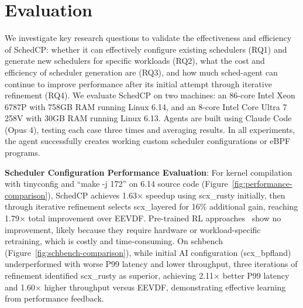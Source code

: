 \documentclass[preprint]{article}
\newcommand{\sys}{SchedCP\xspace}
\newcommand{\agent}{sched-agent\xspace}
\begin{document}
\section{Evaluation}
\label{sec:evaluation}


We investigate key research questions to validate the effectiveness and efficiency of \sys: whether it can effectively configure existing schedulers (RQ1) and generate new schedulers for specific workloads (RQ2), what the cost and efficiency of scheduler generation are (RQ3), and how much \agent can continue to improve performance after its initial attempt through iterative refinement (RQ4). We evaluate \sys on two machines: an 86-core Intel Xeon 6787P with 758GB RAM running Linux 6.14, and an 8-core Intel Core Ultra 7 258V with 30GB RAM running Linux 6.13. Agents are built using Claude Code (Opus 4), testing each case three times and averaging results. In all experiments, the agent successfully creates working custom scheduler configurations or eBPF programs.

\textbf{Scheduler Configuration Performance Evaluation}: For kernel compilation with tinyconfig and ``make -j 172'' on 6.14 source code (Figure~\ref{fig:performance-comparison}), \sys achieves 1.63× speedup using scx\_rusty initially, then through iterative refinement selects scx\_layered for 16\% additional gain, reaching 1.79× total improvement over EEVDF. Pre-trained RL approaches~\cite{corbet2025ml} show no improvement, likely because they require hardware or workload-specific retraining, which is costly and time-consuming. On schbench~\cite{schbench2016} (Figure~\ref{fig:schbench-comparison}), while initial AI configuration (scx\_bpfland) underperformed with worse P99 latency and lower throughput, three iterations of refinement identified scx\_rusty as superior, achieving 2.11× better P99 latency and 1.60× higher throughput versus EEVDF, demonstrating effective learning from performance feedback.
\end{document}
